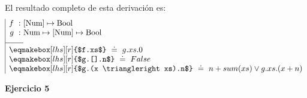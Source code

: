 \documentclass[12pt]{article}
\begin{document}
\begin{itemize}
    El resultado completo de esta derivación es:
    \[
    \begin{array}{| r @{} l }
        f ~ : ~ & [\text{Num}] \mapsto \text{Bool} \\
        \rule[-10pt]{0pt}{0pt}g ~ : ~ & \text{Num} \mapsto [\text{Num}] \mapsto \text{Bool} \\
        \cline{1-1}
        \multicolumn{2}{|l}{\rule{0pt}{12pt}\eqmakebox[lhs][r]{$f.xs$} ~ \doteq ~ g.xs.0} \\
        \multicolumn{2}{|l}{\eqmakebox[lhs][r]{$g.[].n$} ~ \doteq ~ False} \\
        \multicolumn{2}{|l}{\eqmakebox[lhs][r]{$g.(x \triangleright xs).n$} ~ \doteq ~ n + sum(xs) \lor g.xs.(x + n)}
    \end{array}
    \]

\end{itemize}

\textbf{Ejercicio 5}
\end{document}
